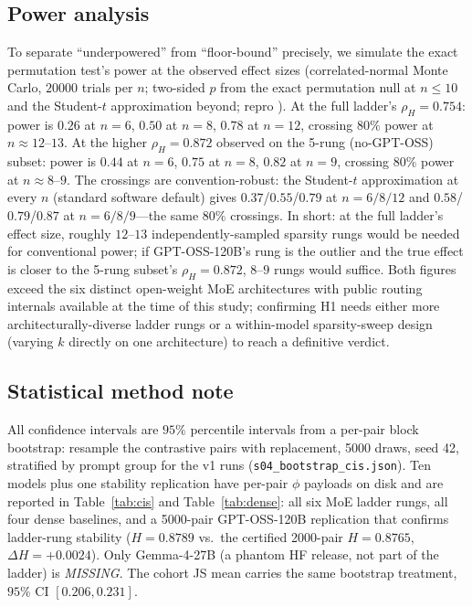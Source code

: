 \documentclass[sigconf]{acmart}
\begin{document}
\subsection{Power analysis}
\label{sec:power}
To separate ``underpowered'' from ``floor-bound'' precisely, we simulate
the exact permutation test's power at the observed effect sizes
(correlated-normal Monte Carlo, $20000$ trials per $n$; two-sided $p$
from the exact permutation null at $n \le 10$ and the Student-$t$
approximation beyond; repro ). At the full
ladder's $\rho_H = 0.754$:
power is $0.26$ at $n=6$, $0.50$ at $n=8$, $0.78$ at $n=12$, crossing
$80\%$ power at $n \approx 12$--$13$. At the higher $\rho_H = 0.872$
observed on the 5-rung (no-GPT-OSS) subset: power is $0.44$ at $n=6$,
$0.75$ at $n=8$, $0.82$ at $n=9$, crossing $80\%$ power at $n \approx
8$--$9$. The crossings are convention-robust: the Student-$t$
approximation at every $n$ (standard software default) gives
$0.37$/$0.55$/$0.79$ at $n=6/8/12$ and $0.58$/$0.79$/$0.87$ at
$n=6/8/9$---the same $80\%$ crossings. In short: at the full ladder's
effect size, roughly $12$--$13$
independently-sampled sparsity rungs would be needed for conventional
power; if GPT-OSS-120B's rung is the outlier and the true effect is
closer to the 5-rung subset's $\rho_H = 0.872$, $8$--$9$ rungs would
suffice. Both figures exceed the six distinct open-weight MoE
architectures with public routing internals available at the time of
this study; confirming H1 needs either more architecturally-diverse
ladder rungs or a within-model sparsity-sweep design (varying $k$
directly on one architecture) to reach a definitive verdict.

\subsection{Statistical method note}
All confidence intervals are $95\%$ percentile intervals from a
per-pair block bootstrap: resample the contrastive pairs with replacement,
5000 draws, seed 42, stratified by prompt group for the v1 runs
(\texttt{s04\_bootstrap\_cis.json}). Ten models plus one stability
replication have per-pair $\phi$ payloads on disk and are reported in
Table~\ref{tab:cis} and Table~\ref{tab:dense}: all six MoE ladder rungs,
all four dense baselines, and a 5000-pair GPT-OSS-120B replication that
confirms ladder-rung stability ($H=0.8789$ vs.\ the certified 2000-pair
$H=0.8765$, $\Delta H = +0.0024$). Only Gemma-4-27B (a phantom HF release,
not part of the ladder) is \emph{MISSING}. The cohort JS mean carries the same
bootstrap treatment, $95\%$ CI $[0.206, 0.231]$.
\end{document}
